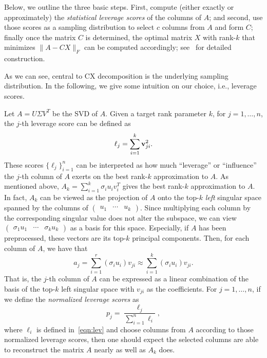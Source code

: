 Below, we outline the three basic steps. First, compute (either exactly or approximately) the {\it statistical leverage scores} of the columns of $A$;
and second, use those scores as a sampling distribution to select $c$ columns from $A$ and form $C$;
finally once the matrix $C$ is determined, the optimal matrix $X$ with rank-$k$ that minimizes $\|A-CX\|_F$ can be computed accordingly; see~\cite{DMM08} for detailed construction.

As we can see, central to CX decomposition is the underlying sampling distribution.
In the following, we give some intuition on our choice, i.e., leverage scores.

Let $A=U\Sigma V^T$ be the SVD of $A$.
Given a target rank parameter $k$, for $j=1,\ldots,n$, the $j$-th leverage score can be defined as
\begin{equation}
 \label{eqn:lev}
  \ell_j = \sum_{i=1}^k \mathbf{v}_{ji}^2.
\end{equation}
These scores $\{\ell_j\}_{i=1}^{n}$ can be interpreted as how much ``leverage'' or ``influence'' the $j$-th column of $A$ exerts on the best rank-$k$ approximation to $A$. 
As mentioned above, $A_k = \sum_{i=1}^k \sigma_i u_i v_i^T$ gives the best rank-$k$ approximation to $A$.
In fact, $A_k$ can be viewed as the projection of $A$ onto the top-$k$ \emph{left} singular space spanned by the columns of $\begin{pmatrix} u_1 & \cdots & u_k \end{pmatrix}$.
Since multiplying each column by the corresponding singular value does not alter the subspace, we can view
$\begin{pmatrix} \sigma_1 u_1 & \cdots & \sigma_k u_k \end{pmatrix}$ as a basis for this space.  
Especially, if $A$ has been preprocessed, these vectors are its top-$k$ principal components.
Then, for each column of $A$, we have that
  $$  a_j = \sum_{i=1}^{r} (\sigma_i u_i) v_{ji} \approx \sum_{i=1}^k (\sigma_i u_i) v_{ji}.  $$
That is, the $j$-th column of $A$ can be expressed as a linear combination of the basis of the top-$k$ left singular space with $v_{ji}$ as the coefficients.
For $j=1,\ldots,n$, if we define the {\it normalized leverage scores} as
\begin{equation}
\label{eqn:nlev}
  p_j = \frac{\ell_j}{\sum_{i=1}^n \ell_i},
\end{equation}      
where $\ell_i$ is defined in~\eqref{eqn:lev} and choose columns from $A$ according to those normalized leverage scores, then one should expect
the selected columns are able to reconstruct the matrix $A$ nearly as well as $A_k$ does.


